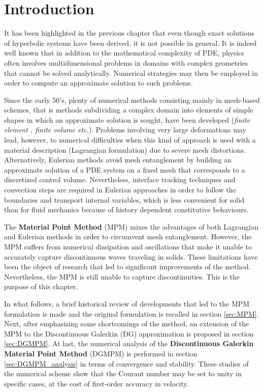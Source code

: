
\section*{Introduction}
It has been highlighted in the previous chapter that even though exact solutions of hyperbolic systems have been derived, it is not possible in general. It is indeed well known that in addition to the mathematical complexity of PDE, physics often involves multidimensional problems in domains with complex geometries that cannot be solved analytically. Numerical strategies may then be employed in order to compute an approximate solution to such problems.

Since the early 50's, plenty of numerical methods consisting mainly in mesh-based schemes, that is methods subdividing a complex domain into elements of simple shapes in which an approximate solution is sought, have been developed (\textit{finite element \cite{Belytschko}, finite volume \cite{Leveque} etc.}). Problems involving very large deformations may lead, however, to numerical difficulties when this kind of approach is used with a material description (Lagrangian formulation) due to severe mesh distortions. Alternatively, Eulerian methods avoid mesh entanglement by building an approximate solution of a PDE system on a fixed mesh that corresponds to a discretized control volume. Nevertheless, interface tracking techniques and convection steps are required in Eulerian approaches in order to follow the boundaries and transport internal variables, which is less convenient for solid than for fluid mechanics because of history dependent constitutive behaviours.

The \textbf{Material Point Method} (MPM) \cite{Sulsky94} mixes the advantages of both Lagrangian and Eulerian methods in order to circumvent mesh entanglement.
However, the MPM suffers from numerical dissipation and oscillations that make it unable to accurately capture discontinuous waves traveling in solids.
These limitations have been the object of research that led to significant improvements of the method.
Nevertheless, the MPM is still unable to capture discontinuities.
This is the purpose of this chapter.

In what follows, a brief historical review of developments that led to the MPM formulation is made and the original formulation is recalled in section \ref{sec:MPM}. Next, after emphasizing some shortcomings of the method, an extension of the MPM to the Discontinuous Galerkin (DG) approximation is proposed in section \ref{sec:DGMPM}. At last, the numerical analysis of the \textbf{Discontinuous Galerkin Material Point Method} (DGMPM) is performed in section \ref{sec:DGMPM_analysis} in terms of convergence and stability. These studies of the numerical scheme show that the Courant number may be set to unity in specific cases, at the cost of first-order accuracy in velocity.



